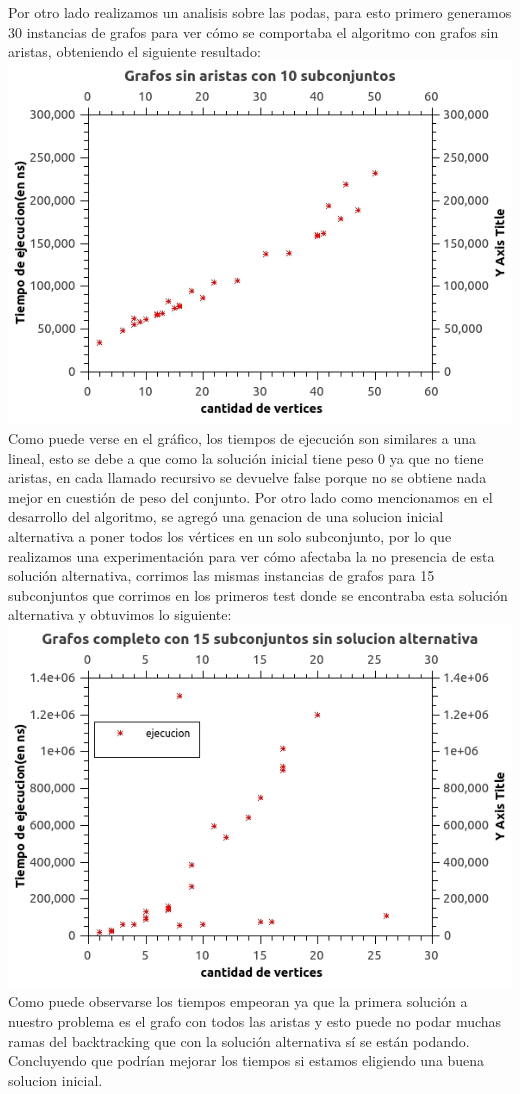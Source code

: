 Por otro lado realizamos un analisis sobre las podas, para esto primero generamos 30 instancias de grafos para ver cómo se comportaba el algoritmo con grafos sin aristas, obteniendo el siguiente resultado:\\
\includegraphics[scale=0.5]{Ej2/sinAristas.jpg}\\
Como puede verse en el gráfico, los tiempos de ejecución son similares a una lineal, esto se debe a que como la solución inicial tiene peso 0 ya que no tiene aristas, en cada llamado recursivo se devuelve false porque no se obtiene nada mejor en cuestión de peso del conjunto.
Por otro lado como mencionamos en el desarrollo del algoritmo, se agregó una genacion de una solucion inicial alternativa a poner todos los vértices en un solo subconjunto, por lo que realizamos una experimentación para ver cómo afectaba la no presencia de esta solución alternativa, corrimos las mismas instancias de grafos para 15 subconjuntos que corrimos en los primeros test donde se encontraba esta solución alternativa y obtuvimos lo siguiente:\\
\includegraphics[scale=0.5]{Ej2/sinAlternativa.jpg}\\

Como puede observarse los tiempos empeoran ya que la primera solución a nuestro problema es el grafo con todos las aristas y esto puede no podar muchas ramas del backtracking que con la solución alternativa sí se están podando. Concluyendo que podrían mejorar los tiempos si estamos eligiendo una buena solucion inicial.